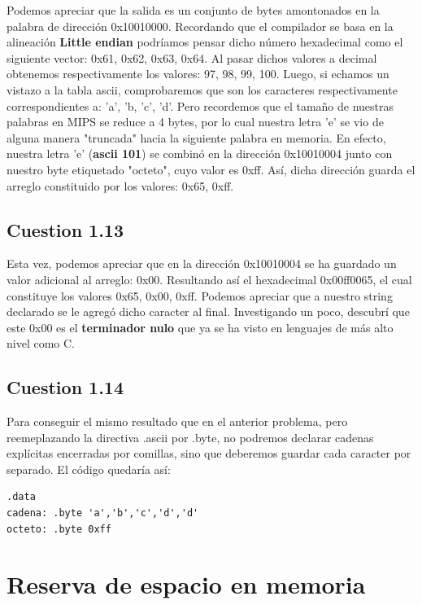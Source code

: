 \documentclass[11pt]{article}
\begin{document}
\begin{large}
\begin{flushleft}
Podemos apreciar que la salida es un conjunto de bytes amontonados en la palabra de dirección 0x10010000. Recordando que el compilador se basa en la alineación \textbf{Little endian} podríamos pensar dicho número hexadecimal como el siguiente vector: 0x61, 0x62, 0x63, 0x64. Al pasar dichos valores a decimal obtenemos respectivamente los valores: 97, 98, 99, 100. Luego, si echamos un vistazo a la tabla ascii, comprobaremos que son los caracteres respectivamente correspondientes a: 'a', 'b, 'c', 'd'. Pero recordemos que el tamaño de nuestras palabras en MIPS se reduce a 4 bytes, por lo cual nuestra letra 'e' se vio de alguna manera "truncada" hacia la siguiente palabra en memoria. En efecto, nuestra letra 'e' (\textbf{ascii 101}) se combinó en la dirección 0x10010004 junto con nuestro byte etiquetado "octeto", cuyo valor es 0xff. Así, dicha dirección guarda el arreglo constituido por los valores: 0x65, 0xff.


\subsection*{Cuestion 1.13}
Esta vez, podemos apreciar que en la dirección 0x10010004 se ha guardado un valor adicional al arreglo: 0x00. Resultando así el hexadecimal 0x00ff0065, el cual constituye los valores 0x65, 0x00, 0xff. Podemos apreciar que a nuestro string declarado se le agregó dicho caracter al final. Investigando un poco, descubrí que este 0x00 es el \textbf{terminador nulo} que ya se ha visto en lenguajes de más alto nivel como C.

\subsection*{Cuestion 1.14}
Para conseguir el mismo resultado que en el anterior problema, pero reemeplazando la directiva .ascii por .byte, no podremos declarar cadenas explícitas encerradas por comillas, sino que deberemos guardar cada caracter por separado. El código quedaría así:

\begin{listing}[h]
\begin{verbatim}
.data
cadena: .byte 'a','b','c','d','d'
octeto: .byte 0xff
\end{verbatim}
\end{listing}

\section*{Reserva de espacio en memoria}


\end{flushleft}
\end{large}
\end{document}
